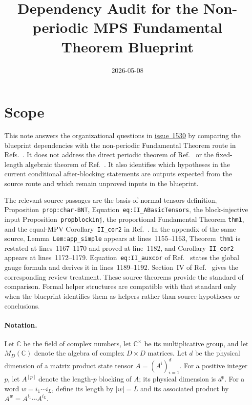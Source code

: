\documentclass{article}
\title{Dependency Audit for the Non-periodic MPS Fundamental Theorem Blueprint}
\author{}
\date{2026-05-08}
\begin{document}
\maketitle
{}

\section{Scope}

This note answers the organizational questions in
\href{https://github.com/LionSR/TNLean/issues/1530}{issue~1530} by comparing
the blueprint dependencies with the non-periodic Fundamental Theorem route in
Refs.~\cite{Cirac2016MPDO_arXiv,Cirac2021Matrix}. It does not address the
direct periodic theorem of Ref.~\cite{DeLasCuevas2017Irreducible} or the
fixed-length algebraic theorem of Ref.~\cite{Molnar2018NormalPEPS}. It also
identifies which hypotheses in the current conditional after-blocking
statements are outputs expected from the source route and which remain
unproved inputs in the blueprint.

The relevant source passages are the basis-of-normal-tensors definition,
Proposition~\texttt{prop:char-BNT},
Equation~\texttt{eq:II\_ABasicTensors}, the block-injective input
Proposition~\texttt{propblockinj}, the proportional Fundamental Theorem
\texttt{thm1}, and the equal-MPV Corollary~\texttt{II\_cor2} in
Ref.~\cite[lines~271--356]{Cirac2016MPDO_arXiv}. In the appendix of the same
source, Lemma~\texttt{Lem:app\_simple} appears at lines~1155--1163,
Theorem~\texttt{thm1} is restated at lines~1167--1170 and proved at
line~1182, and Corollary~\texttt{II\_cor2} appears at lines~1172--1179.
Equation~\texttt{eq:II\_auxcor} of
Ref.~\cite[lines~1175--1192]{Cirac2016MPDO_arXiv} states the global gauge
formula and derives it in lines~1189--1192. Section~IV of
Ref.~\cite{Cirac2021Matrix} gives the corresponding review treatment. These
source theorems provide the standard of comparison. Formal helper structures
are compatible with that standard only when the blueprint identifies them as
helpers rather than source hypotheses or conclusions.

\paragraph{Notation.}
Let $\mathbb{C}$ be the field of complex numbers, let
$\mathbb{C}^{\times}$ be its multiplicative group, and let
$M_D(\mathbb{C})$ denote the algebra of complex $D\times D$ matrices. Let $d$
be the physical dimension of a matrix product state tensor
$A=(A^i)_{i=1}^d$. For a positive integer $p$, let $A^{[p]}$ denote the
length-$p$ blocking of $A$; its physical dimension is $d^p$. For a word
$w=i_1\cdots i_L$, define its length by $|w|=L$ and its associated product by
$A^w=A^{i_1}\cdots A^{i_L}$.
\end{document}
